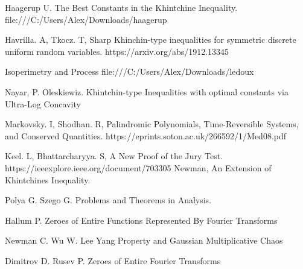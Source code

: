 \documentclass[10pt]{article}
\newcommand{\1}{\textbf{1}}
\theoremstyle{remark}
\theoremstyle{definition}
\begin{document}
\begin{thebibliography}{9}

 Haagerup U. The Best Constants in the Khintchine Inequality. file:///C:/Users/Alex/Downloads/haagerup%

 Havrilla. A, Tkocz. T, Sharp Khinchin-type inequalities for symmetric discrete uniform random variables. https://arxiv.org/abs/1912.13345

 Isoperimetry and Process file:///C:/Users/Alex/Downloads/ledoux%

 Nayar, P. Oleskiewiz. Khintchin-type Inequalities with optimal constants via Ultra-Log Concavity


 Markovsky. I, Shodhan. R,
Palindromic Polynomials, Time-Reversible Systems, and Conserved Quantities. https://eprints.soton.ac.uk/266592/1/Med08.pdf

 Keel. L, Bhattarcharyya. S,
A New Proof of the Jury Test. https://ieeexplore.ieee.org/document/703305
 Newman, An Extension of Khintchines Inequality. 

 Polya G. Szego G. Problems and Theorems in Analysis. 

 Hallum P. Zeroes of Entire Functions Represented By Fourier Transforms

 Newman C. Wu W. Lee Yang Property and Gaussian Multiplicative Chaos

 Dimitrov D. Rusev P. Zeroes of Entire Fourier Transforms

\end{thebibliography}
\end{document}
